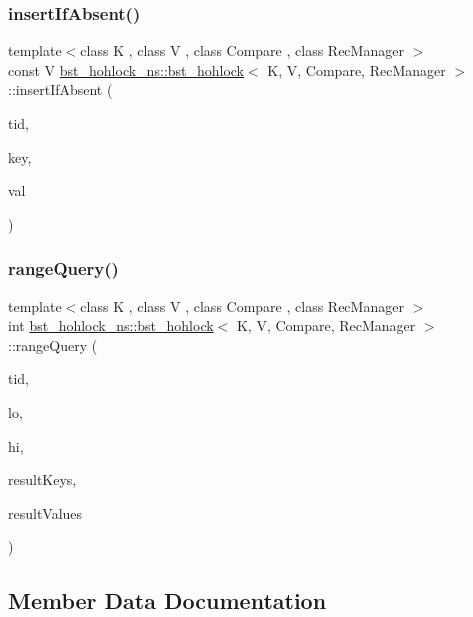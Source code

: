 \subsubsection{\texorpdfstring{insert\+If\+Absent()}{insertIfAbsent()}}
{\footnotesize\ttfamily template$<$class K , class V , class Compare , class Rec\+Manager $>$ \\
const V \hyperlink{classbst__hohlock__ns_1_1bst__hohlock}{bst\+\_\+hohlock\+\_\+ns\+::bst\+\_\+hohlock}$<$ K, V, Compare, Rec\+Manager $>$\+::insert\+If\+Absent (\begin{DoxyParamCaption}\item[{const int}]{tid,  }\item[{const K \&}]{key,  }\item[{const V \&}]{val }\end{DoxyParamCaption})\hspace{0.3cm}{\ttfamily [inline]}}

\mbox{\label{classbst__hohlock__ns_1_1bst__hohlock_af75ce1966e19ad70a446847d29f40216}} 
\subsubsection{\texorpdfstring{range\+Query()}{rangeQuery()}}
{\footnotesize\ttfamily template$<$class K , class V , class Compare , class Rec\+Manager $>$ \\
int \hyperlink{classbst__hohlock__ns_1_1bst__hohlock}{bst\+\_\+hohlock\+\_\+ns\+::bst\+\_\+hohlock}$<$ K, V, Compare, Rec\+Manager $>$\+::range\+Query (\begin{DoxyParamCaption}\item[{const int}]{tid,  }\item[{const K \&}]{lo,  }\item[{const K \&}]{hi,  }\item[{K $\ast$const}]{result\+Keys,  }\item[{V $\ast$const}]{result\+Values }\end{DoxyParamCaption})\hspace{0.3cm}{\ttfamily [inline]}}



\subsection{Member Data Documentation}
\mbox{\label{classbst__hohlock__ns_1_1bst__hohlock_a6197b46d1d114130bce12e6db712c88f}} 
